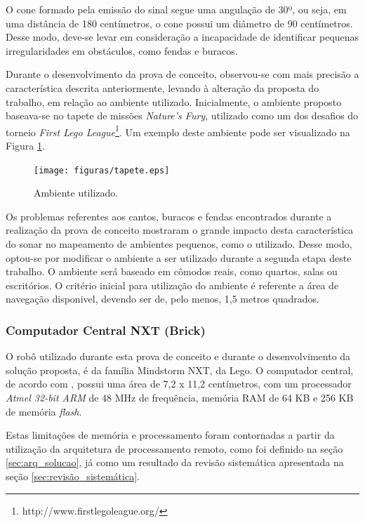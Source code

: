 \begin{itemize}
				O cone formado pela emissão do sinal segue uma angulação de 30º, ou seja, em uma distância de 180 centímetros, o cone possui um diâmetro de 90 centímetros. Desse modo, deve-se levar em consideração a incapacidade de identificar pequenas irregularidades em obstáculos, como fendas e buracos.

				Durante o desenvolvimento da prova de conceito, observou-se com mais precisão a característica descrita anteriormente,
				levando à alteração da proposta do trabalho, em relação ao ambiente utilizado. Inicialmente, o ambiente proposto baseava-se no
				tapete de missões \textit{Nature's Fury}, utilizado como um dos desafios do torneio \textit{First Lego League}\footnote{http://www.firstlegoleague.org/}.
				Um exemplo deste ambiente pode ser visualizado na Figura \ref{img:tapete}.

				\begin{figure}[H]
					\centering
					\texttt{[image: figuras/tapete.eps]}
					\caption[Ambiente Proposto Inicialmente]{Ambiente utilizado.}
					\label{img:tapete}
				\end{figure}

				Os problemas referentes aos cantos, buracos e fendas encontrados durante a realização da prova de conceito mostraram o grande
				impacto desta característica do sonar no mapeamento de ambientes pequenos, como o utilizado. Desse modo, optou-se por modificar
				o ambiente a ser utilizado durante a segunda etapa deste trabalho. O ambiente será baseado em cômodos reais, como quartos, salas
				ou escritórios. O critério inicial para utilização do ambiente é referente a área de navegação disponivel, devendo ser de, pelo
				menos, 1,5 metros quadrados.

		\end{itemize}

		\subsubsection{Computador Central NXT (Brick)} %
		\label{sub:brick}

			O robô utilizado durante esta prova de conceito e durante o desenvolvimento da solução proposta, é da família Mindstorm NXT, da Lego. O computador central, de acordo com \cite{legonxj}, possui uma área de 7,2 x 11,2 centímetros, com um processador \textit{Atmel 32-bit ARM} de 48 MHz de frequência, memória RAM de 64 KB e 256 KB de memória \textit{flash}.

			Estas limitações de memória e processamento foram contornadas a partir da utilização da arquitetura de processamento remoto,
			como foi definido na seção \ref{sec:arq_solucao}, já como um resultado da revisão sistemática apresentada na seção \ref{sec:revisão_sistemática}.
